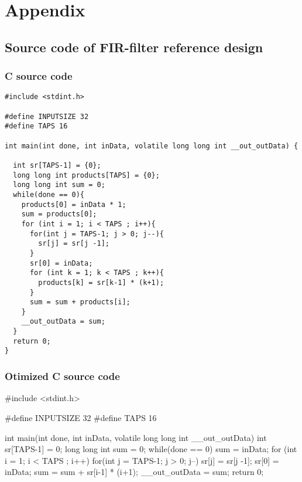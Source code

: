 \chapter{Appendix}
\section{\label{sec:sourcecode}Source code of FIR-filter reference design}
\subsection{\label{subsec:cfircode}C source code}
\lstset{language=C,style=CStyle}
\begin{lstlisting}
#include <stdint.h>

#define INPUTSIZE 32
#define TAPS 16

int main(int done, int inData, volatile long long int __out_outData) {

  int sr[TAPS-1] = {0};
  long long int products[TAPS] = {0};
  long long int sum = 0;
  while(done == 0){
    products[0] = inData * 1;
    sum = products[0];
    for (int i = 1; i < TAPS ; i++){
      for(int j = TAPS-1; j > 0; j--){
        sr[j] = sr[j -1];
      }
      sr[0] = inData;
      for (int k = 1; k < TAPS ; k++){
        products[k] = sr[k-1] * (k+1);
      }
      sum = sum + products[i];
    }
    __out_outData = sum;
  }
  return 0;
}
\end{lstlisting}

\subsection{\label{subsec:cfircode2}Otimized C source code}
#include <stdint.h>

#define INPUTSIZE 32
#define TAPS 16

int main(int done, int inData, volatile long long int __out_outData) {
  int sr[TAPS-1] = {0};
  long long int sum = 0;
  while(done == 0){
    sum = inData;
    for (int i = 1; i < TAPS ; i++){
      for(int j = TAPS-1; j > 0; j--){
        sr[j] = sr[j -1];
      }
      sr[0] = inData;
      sum = sum + sr[i-1] * (i+1);
    }
    __out_outData = sum;
  }
  return 0;
}

